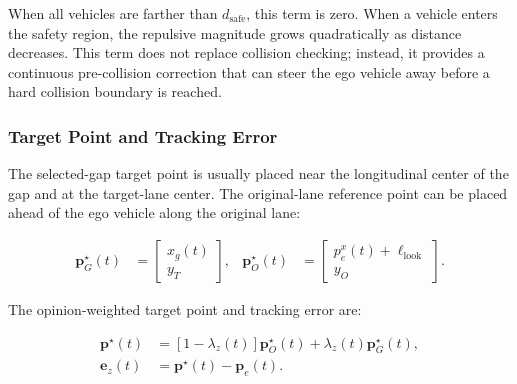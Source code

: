 When all vehicles are farther than \(d_{\mathrm{safe}}\), this term is zero. When a vehicle enters the safety region, the repulsive magnitude grows quadratically as distance decreases. This term does not replace collision checking; instead, it provides a continuous pre-collision correction that can steer the ego vehicle away before a hard collision boundary is reached.



\subsubsection{Target Point and Tracking Error}





The selected-gap target point is usually placed near the longitudinal center of the gap and at the target-lane center. The original-lane reference point can be placed ahead of the ego vehicle along the original lane:



{\small
\begin{equation}
\begin{aligned}
\mathbf{p}_G^{\star}(t)&=\begin{bmatrix}x_g(t)\\y_T\end{bmatrix},&
\mathbf{p}_O^{\star}(t)&=\begin{bmatrix}p_e^x(t)+\ell_{\mathrm{look}}\\y_O\end{bmatrix}.
\end{aligned}
\end{equation}
}







The opinion-weighted target point and tracking error are:



{\small
\begin{equation}
\begin{aligned}
\mathbf{p}^{\star}(t)&=\left[1-\lambda_z(t)\right]\mathbf{p}_O^{\star}(t)+\lambda_z(t)\mathbf{p}_G^{\star}(t),\\
\mathbf{e}_z(t)&=\mathbf{p}^{\star}(t)-\mathbf{p}_e(t).
\end{aligned}
\end{equation}
}







